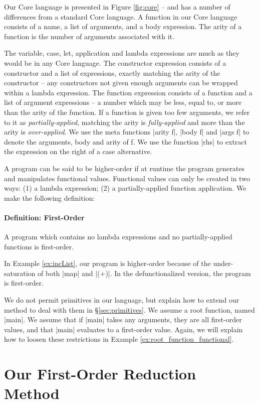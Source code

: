 \documentclass[preprint]{sigplanconf}
\begin{document}
Our Core language is presented in Figure \ref{fig:core} -- and has a number of differences from a standard Core language. A function in our Core language consists of a name, a list of arguments, and a body expression. The arity of a function is the number of arguments associated with it.

The variable, case, let, application and lambda expressions are much as they would be in any Core language. The constructor expression consists of a constructor and a list of expressions, exactly matching the arity of the constructor -- any constructors not given enough arguments can be wrapped within a lambda expression. The function expression consists of a function and a list of argument expressions -- a number which may be less, equal to, or more than the arity of the function. If a function is given too few arguments, we refer to it as \textit{partially-applied}, matching the arity is \textit{fully-applied} and more than the arity is \textit{over-applied}. We use the meta functions |arity f|, |body f| and |args f| to denote the arguments, body and arity of f. We use the function |rhs| to extract the expression on the right of a case alternative.

A program can be said to be higher-order if at runtime the program generates and manipulates functional values. Functional values can only be created in two ways: (1) a lambda expression; (2) a partially-applied function application. We make the following definition:

\paragraph{Definition: First-Order} A program which contains no lambda expressions and no partially-applied functions is first-order.

In Example \ref{ex:incList}, our program is higher-order because of the under-saturation of both |map| and |(+)|. In the defunctionalized version, the program is first-order.

We do not permit primitives in our language, but explain how to extend our method to deal with them in \S\ref{sec:primitives}. We assume a root function, named |main|. We assume that if |main| takes any arguments, they are all first-order values, and that |main| evaluates to a first-order value. Again, we will explain how to loosen these restrictions in Example \ref{ex:root_function_functional}.


\section{Our First-Order Reduction Method}
\label{sec:overview}
\end{document}
